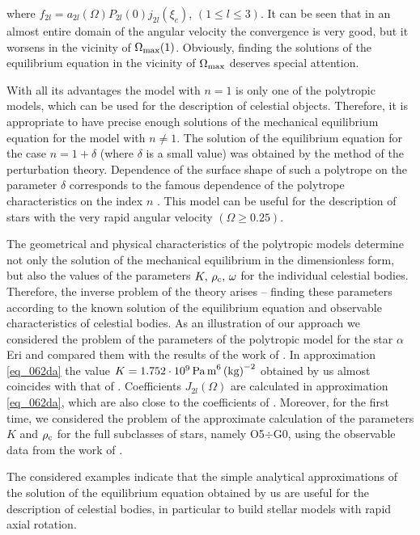 \documentclass{caosp308}
\begin{document}
where $f_{2l}=a_{2l}(\Omega)P_{2l}(0)j_{2l}(\xi_e)$, $(1\leq l\leq3)$. It can be seen that in an almost entire domain of the angular velocity the convergence  is very good, but it worsens in the vicinity of $\Omega_{\rm max}(1)$. Obviously, finding the solutions of the equilibrium equation in the vicinity of $\Omega_{\rm max}$ deserves special attention.
 
With all its advantages the model with $n=1$ is only one of the polytropic models, which can be used for the description of celestial objects. Therefore, it is appropriate to have precise enough solutions of the mechanical equilibrium equation for the model with $n\ne1$. The solution of the equilibrium equation for the case $n=1+\delta$ (where $\delta$ is a small value) was obtained by the method of the perturbation theory. Dependence of the surface shape of such a polytrope on the parameter $\delta$ corresponds to the famous dependence of the polytrope characteristics on the index $n$ \citep{1933MNRAS..93..390C}. This model can be useful for the description of stars with the very rapid angular velocity $(\Omega\geq0.25)$.

The geometrical and physical characteristics of the polytropic models determine not only the solution of the mechanical equilibrium in the dimensionless form, but also the values of the parameters $K,\,\rho_{\rm c},\,\omega$ for the individual celestial bodies. Therefore, the inverse problem of the theory arises -- finding these parameters according to the known solution of the equilibrium equation and observable characteristics of celestial bodies. As an illustration of our approach we considered the problem of the parameters of the polytropic model for the star $\alpha$ Eri and compared them with the results of the work of \citet{2015MNRAS.448..456K}. In approximation \eqref{eq_062da} the value $K=1.752\cdot10^9\,\text{Pa\,m}^6\,\text{(kg)}^{-2}$ obtained by us almost coincides with that of \citet{2015MNRAS.448..456K}. Coefficients $J_{2l}(\Omega)$ are calculated in approximation \eqref{eq_062da}, which are also close to the coefficients of \citet{2015MNRAS.448..456K}. Moreover, for the first time, we considered the problem of the approximate calculation of the parameters $K$ and $\rho_{\rm c}$ for the full subclasses of stars, namely O5$\div$G0, using the observable data from the work of \citet{1965Obs....85..166M}. 

The considered examples indicate that the simple analytical approximations of the solution of the equilibrium equation obtained by us are useful for the description of celestial bodies, in particular to build stellar models with rapid axial rotation.


\end{document}
